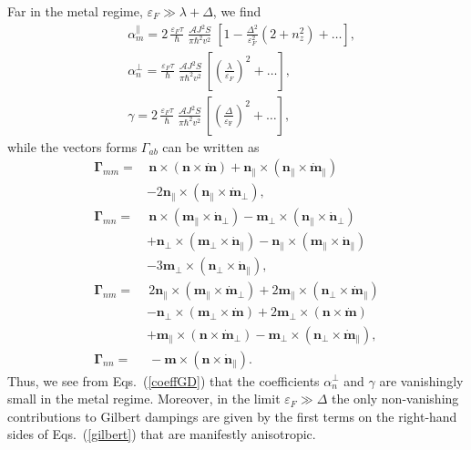 \documentclass[%
  twocolumn,
  aps,
  prb,
  amsmath,
  amssymb,
  superscriptaddress,
  nofootinbib,
  floatfix
]{revtex4-1}
\newcommand{\beml}{\begin{subequations}}
\newcommand{\eml}{\end{subequations}}
\newcommand{\lt}{\left}
\newcommand{\rt}{\right}
\newcommand{\n}{\nonumber}
\newcommand{\ep}{\varepsilon}
\newcommand{\bb}{\boldsymbol}
\newcommand{\0}{^{\phantom{\dagger}}}
\begin{document}
Far in the metal regime, $\ep_F\gg \lambda+\Delta$, we find
\beml
\label{coeffGD}
\begin{align}
&\alpha_m^\parallel= 2\,\frac{\ep_F\tau}{\hbar}\;\frac{\mathcal{A} J^2 S}{\pi\hbar^2v^2}\; \lt[1-\frac{\Delta^2}{\ep_F^2}(2+n^2_z) + \dots\rt],\\
&\alpha_n^\perp = \frac{\ep_F\tau}{\hbar}\;\frac{\mathcal{A} J^2 S}{\pi\hbar^2v^2} \,\lt[\lt(\frac{\lambda}{\ep_F}\rt)^2+\dots\rt],\\
&\gamma= 2\,\frac{\ep_F\tau}{\hbar}\;\frac{\mathcal{A} J^2 S}{\pi\hbar^2v^2}\,\lt[\lt(\frac{\Delta}{\ep_\textrm{F}}\rt)^2+\dots\rt],
\end{align}
\eml
while the vectors forms $\Gamma_{ab}$ can be written as
\beml
\begin{align}
\bb{\Gamma}_{mm}=&\,
\bb{n}\!\times\!(\bb{n}\!\times\!\dot{\bb{m}}) + \bb{n}_\parallel\!\times\!(\bb{n}_\parallel\!\times\!\dot{\bb{m}}_\parallel) \n\\ 
&- 2 \bb{n}_\parallel\!\times\!(\bb{n}_\parallel\!\times\!\dot{\bb{m}}_\perp),\\
\bb{\Gamma}_{mn}=&\,
\bb{n}\!\times\!(\bb{m}_\parallel\!\times\!\dot{\bb{n}}_\perp) 
- \bb{m}_\perp\!\times\!(\bb{n}_\parallel\!\times\!\dot{\bb{n}}_\perp)\n\\
&+\bb{n}_\perp\!\times\!(\bb{m}_\perp\!\times\!\dot{\bb{n}}_\parallel) 
- \bb{n}_\parallel\!\times\!(\bb{m}_\parallel\!\times\!\dot{\bb{n}}_\parallel)\n\\
&- 3\bb{m}_\perp\!\times\!(\bb{n}_\perp\!\times\!\dot{\bb{n}}_\parallel),\\
\bb{\Gamma}_{nm}=&\,2\bb{n}_\parallel\!\times\!(\bb{m}_\parallel\!\times\!\dot{\bb{m}}_\perp)+ 
2\bb{m}_\parallel\!\times\!(\bb{n}_\perp\!\times\!\dot{\bb{m}}_\parallel)\n\\
&-\bb{n}_\perp\!\times\!(\bb{m}_\perp\!\times\!\dot{\bb{m}})+2 \bb{m}_\perp\!\times\!(\bb{n}\!\times\!\dot{\bb{m}})\n\\
&+ \bb{m}_\parallel\!\times\!(\bb{n}\!\times\!\dot{\bb{m}}_\perp) 
- \bb{m}_\perp\!\times\!(\bb{n}_\perp\!\times\!\dot{\bb{m}}_\parallel),\\
\bb{\Gamma}_{nn}=&\,-\bb{m}\times(\bb{n}\times\dot{\bb{n}}_\parallel).
\end{align}
\eml
Thus, we see from Eqs.~(\ref{coeffGD}) that the coefficients $\alpha_n^{\perp}$ and $\gamma$ are vanishingly small in the metal regime. Moreover, in the limit $\ep_F\gg \Delta$ the only non-vanishing contributions to Gilbert dampings are given by the first terms on the right-hand sides of Eqs.~(\ref{gilbert}) that are manifestly anisotropic.
\end{document}
